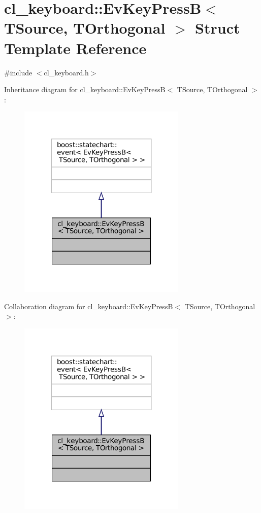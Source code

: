 \hypertarget{structcl__keyboard_1_1EvKeyPressB}{}\section{cl\+\_\+keyboard\+:\+:Ev\+Key\+PressB$<$ T\+Source, T\+Orthogonal $>$ Struct Template Reference}
\label{structcl__keyboard_1_1EvKeyPressB}


{\ttfamily \#include $<$cl\+\_\+keyboard.\+h$>$}



Inheritance diagram for cl\+\_\+keyboard\+:\+:Ev\+Key\+PressB$<$ T\+Source, T\+Orthogonal $>$\+:
\nopagebreak
\begin{figure}[H]
\begin{center}
\leavevmode
\includegraphics[width=227pt]{structcl__keyboard_1_1EvKeyPressB__inherit__graph}
\end{center}
\end{figure}


Collaboration diagram for cl\+\_\+keyboard\+:\+:Ev\+Key\+PressB$<$ T\+Source, T\+Orthogonal $>$\+:
\nopagebreak
\begin{figure}[H]
\begin{center}
\leavevmode
\includegraphics[width=227pt]{structcl__keyboard_1_1EvKeyPressB__coll__graph}
\end{center}
\end{figure}


